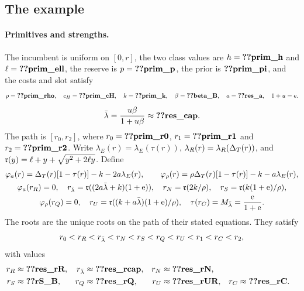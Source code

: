 \subsection*{The example}
\paragraph{Primitives and strengths.}
The incumbent is uniform on \([0,r]\), the two class values are \(h=\reg{prim_h}\) and \(\ell=\reg{prim_ell}\),
the reserve is \(p=\reg{prim_p}\), the prior is \(\reg{prim_pi}\), and the costs and slot satisfy
\[
 \rho=\reg{prim_rho},\quad c_H=\reg{prim_cH},\quad k=\reg{prim_k},\quad
 \beta=\reg{beta_B},\quad a=\reg{res_a},\quad 1+u=\eu.
\]
\[
 \lb=\frac{u\beta}{1+u\beta}\approx\reg{res_cap}.
\]
The path is \([r_0,r_2]\), where \(r_0=\reg{prim_r0}\), \(r_1=\reg{prim_r1}\) and \(r_2=\reg{prim_r2}\).
Write \(\lambda_E(r)=\lambda_E(\tau(r))\), \(\lambda_R(r)=\lambda_R(\Delta_T(r))\), and
\(\mathfrak{r}(y)=\ell+y+\sqrt{y^2+2\ell y}\). Define
\begin{gather*}
 \varphi_a(r)=\Delta_T(r)[1-\tau(r)]-k-2a\lambda_E(r),\qquad
 \varphi_\rho(r)=\rho\Delta_T(r)[1-\tau(r)]-k-a\lambda_E(r),\\
 \varphi_a(r_R)=0,\quad r_{\bar\lambda}=\mathfrak{r}((2a\bar\lambda+k)(1+\mathrm{e})),\quad
 r_N=\mathfrak{r}(2k/\rho),\quad r_S=\mathfrak{r}(k(1+\mathrm{e})/\rho),\\
 \varphi_\rho(r_Q)=0,\quad r_U=\mathfrak{r}((k+a\bar\lambda)(1+\mathrm{e})/\rho),\quad
 \tau(r_C)=M_{\bar\lambda}=\frac{\mathrm{e}}{1+\mathrm{e}}.
\end{gather*}
The roots are the unique roots on the path of their stated equations. They satisfy
\[
 r_0<r_R<r_{\bar\lambda}<r_N<r_S<r_Q<r_U<r_1<r_C<r_2,
\]
with values
\begin{align*}
 r_R&\approx\reg{res_rR},&r_{\lb}&\approx\reg{res_rcap},&r_N&\approx\reg{res_rN},\\
 r_S&\approx\reg{rS_B},&r_Q&\approx\reg{res_rQ},&r_U&\approx\reg{res_rUR},&r_C&\approx\reg{res_rC}.
\end{align*}

